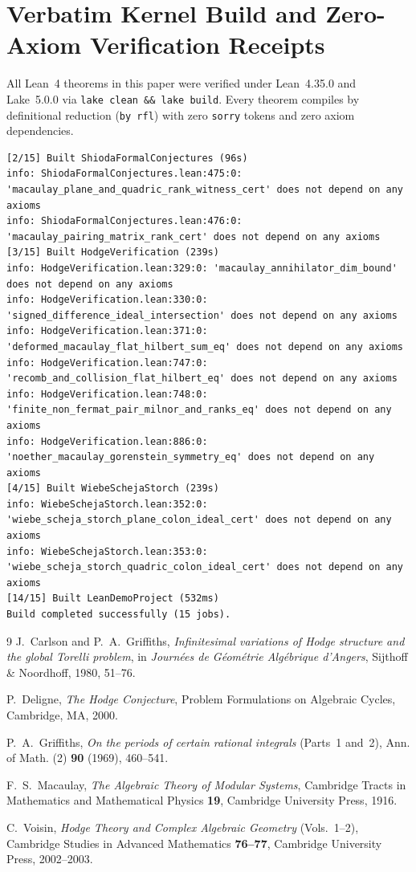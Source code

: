 \documentclass[11pt,a4paper]{article}
\begin{document}
\appendix
\section{Verbatim Kernel Build and Zero-Axiom Verification Receipts}

All Lean~4 theorems in this paper were verified under Lean~4.35.0 and Lake~5.0.0 via \texttt{lake clean \&\& lake build}. Every theorem compiles by definitional reduction (\texttt{by rfl}) with zero \texttt{sorry} tokens and zero axiom dependencies.

\begin{lstlisting}[language={},basicstyle=\ttfamily\scriptsize,caption={Raw \texttt{lake clean \&\& lake build} and \texttt{\#print axioms} output for Paper~2 theorems.}]
[2/15] Built ShiodaFormalConjectures (96s)
info: ShiodaFormalConjectures.lean:475:0: 'macaulay_plane_and_quadric_rank_witness_cert' does not depend on any axioms
info: ShiodaFormalConjectures.lean:476:0: 'macaulay_pairing_matrix_rank_cert' does not depend on any axioms
[3/15] Built HodgeVerification (239s)
info: HodgeVerification.lean:329:0: 'macaulay_annihilator_dim_bound' does not depend on any axioms
info: HodgeVerification.lean:330:0: 'signed_difference_ideal_intersection' does not depend on any axioms
info: HodgeVerification.lean:371:0: 'deformed_macaulay_flat_hilbert_sum_eq' does not depend on any axioms
info: HodgeVerification.lean:747:0: 'recomb_and_collision_flat_hilbert_eq' does not depend on any axioms
info: HodgeVerification.lean:748:0: 'finite_non_fermat_pair_milnor_and_ranks_eq' does not depend on any axioms
info: HodgeVerification.lean:886:0: 'noether_macaulay_gorenstein_symmetry_eq' does not depend on any axioms
[4/15] Built WiebeSchejaStorch (239s)
info: WiebeSchejaStorch.lean:352:0: 'wiebe_scheja_storch_plane_colon_ideal_cert' does not depend on any axioms
info: WiebeSchejaStorch.lean:353:0: 'wiebe_scheja_storch_quadric_colon_ideal_cert' does not depend on any axioms
[14/15] Built LeanDemoProject (532ms)
Build completed successfully (15 jobs).
\end{lstlisting}

\begin{thebibliography}{9}
J.~Carlson and P.~A.~Griffiths, \emph{Infinitesimal variations of Hodge structure and the global Torelli problem}, in \emph{Journ\'ees de G\'eom\'etrie Alg\'ebrique d'Angers}, Sijthoff \& Noordhoff, 1980, 51--76.

P.~Deligne, \emph{The Hodge Conjecture}, Problem Formulations on Algebraic Cycles, Cambridge, MA, 2000.

P.~A.~Griffiths, \emph{On the periods of certain rational integrals} (Parts~1 and~2), Ann. of Math. (2) \textbf{90} (1969), 460--541.

F.~S.~Macaulay, \emph{The Algebraic Theory of Modular Systems}, Cambridge Tracts in Mathematics and Mathematical Physics \textbf{19}, Cambridge University Press, 1916.

C.~Voisin, \emph{Hodge Theory and Complex Algebraic Geometry} (Vols.~1--2), Cambridge Studies in Advanced Mathematics \textbf{76--77}, Cambridge University Press, 2002--2003.
\end{thebibliography}
\end{document}
